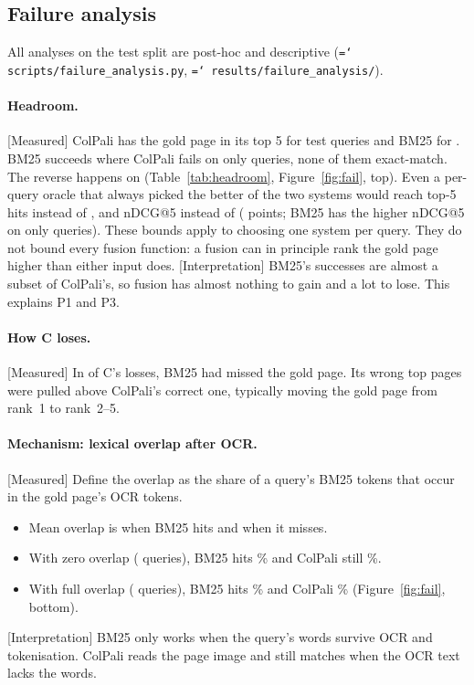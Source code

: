 \documentclass[11pt,a4paper]{article}
\newcommand{\lbl}[2]{\textsf{\scriptsize\textcolor{#1}{[#2]}}}
\newcommand{\Int}{\lbl{tagI}{Interpretation}}
\newcommand{\Mea}{\lbl{tagM}{Measured}}
\newcommand{\file}[1]{\texttt{\small\hyphenchar\font=`\/ #1}}
\begin{document}
\FloatBarrier
\subsection{Failure analysis}
\label{sec:failure}
All analyses on the test split are post-hoc and descriptive (\file{scripts/failure\_analysis.py}, \file{results/failure\_analysis/}).

\begin{table}[!htbp]\centering\small

\caption{\Mea{} Who finds the gold page in the top 5, test split.}\label{tab:headroom}
\end{table}

\paragraph{Headroom.} \Mea{} ColPali has the gold page in its top 5 for \hitB{} test queries and BM25 for \hitA{}. BM25 succeeds where ColPali fails on only \headallAnotB{} queries, none of them exact-match. The reverse happens on \headallBnotA{} (Table~\ref{tab:headroom}, Figure~\ref{fig:fail}, top).
Even a per-query oracle that always picked the better of the two systems would reach \oracle{} top-5 hits instead of \hitB{}, and nDCG@5 \oracleNDCG{} instead of \testB{} (\oracleGainPts{} points; BM25 has the higher nDCG@5 on only \oracleAbetter{} queries). These bounds apply to choosing one system per query. They do not bound every fusion function: a fusion can in principle rank the gold page higher than either input does.
\Int{} BM25's successes are almost a subset of ColPali's, so fusion has almost nothing to gain and a lot to lose. This explains P1 and P3.

\paragraph{How C loses.} \Mea{} In \cLossBMmissed{} of C's \cLosses{} losses, BM25 had missed the gold page. Its wrong top pages were pulled above ColPali's correct one, typically moving the gold page from rank~1 to rank~2--5.

\paragraph{Mechanism: lexical overlap after OCR.} \Mea{} Define the overlap as the share of a query's BM25 tokens that occur in the gold page's OCR tokens.
\begin{itemize}
  \item Mean overlap is \ovAhit{} when BM25 hits and \ovAmiss{} when it misses.
  \item With zero overlap (\ovZeroN{} queries), BM25 hits \ovZeroA{}\% and ColPali still \ovZeroB{}\%.
  \item With full overlap (\ovOneN{} queries), BM25 hits \ovOneA{}\% and ColPali \ovOneB{}\% (Figure~\ref{fig:fail}, bottom).
\end{itemize}
\Int{} BM25 only works when the query's words survive OCR and tokenisation. ColPali reads the page image and still matches when the OCR text lacks the words.
\end{document}
